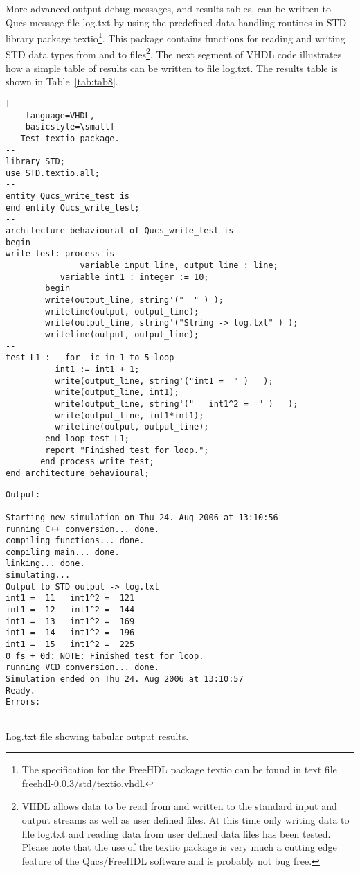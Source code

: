 More advanced output debug messages, and results tables, can be written to Qucs message file log.txt by using the predefined data handling routines in STD library package textio\footnote{The specification for the FreeHDL package textio can be found in text file freehdl-0.0.3/std/textio.vhdl.}. This package contains functions for reading and writing STD data types from and to files\footnote{VHDL allows data to be read from and written to the standard input and output streams as well as user defined files. At this time only writing data to file log.txt and reading data from user defined data files has been tested. Please note that the use of the textio package is very much a cutting edge feature of the Qucs/FreeHDL software and is probably not bug free.}.  The next segment of VHDL code illustrates how a simple table of results can be written to file log.txt. The results table is shown in Table~\ref{tab:tab8}.

\begin{lstlisting}[
    language=VHDL,
    basicstyle=\small]
-- Test textio package.
--
library STD;
use STD.textio.all;
--
entity Qucs_write_test is
end entity Qucs_write_test;
--
architecture behavioural of Qucs_write_test is
begin
write_test: process is
               variable input_line, output_line : line;
	       variable int1 : integer := 10;
	    begin
		write(output_line, string'("  " ) );
		writeline(output, output_line);
		write(output_line, string'("String -> log.txt" ) );
		writeline(output, output_line);
--
test_L1	:	for  ic in 1 to 5 loop
		  int1 := int1 + 1;
		  write(output_line, string'("int1 =  " )   );
		  write(output_line, int1);
		  write(output_line, string'("   int1^2 =  " )   );
		  write(output_line, int1*int1);
		  writeline(output, output_line);
		end loop test_L1;
		report "Finished test for loop.";
	   end process write_test;
end architecture behavioural;
\end{lstlisting} 


\FloatBarrier  
\begin{table}
\begin{verbatim}
Output:
----------
Starting new simulation on Thu 24. Aug 2006 at 13:10:56 
running C++ conversion... done. 
compiling functions... done. 
compiling main... done. 
linking... done. 
simulating... 
Output to STD output -> log.txt 
int1 =  11   int1^2 =  121 
int1 =  12   int1^2 =  144 
int1 =  13   int1^2 =  169 
int1 =  14   int1^2 =  196 
int1 =  15   int1^2 =  225 
0 fs + 0d: NOTE: Finished test for loop. 
running VCD conversion... done. 
Simulation ended on Thu 24. Aug 2006 at 13:10:57 
Ready. 
Errors:
--------
\end{verbatim} 
\caption{Log.txt file showing tabular output results.}
\label{tab:tab8}
\end{table}
\FloatBarrier
  
